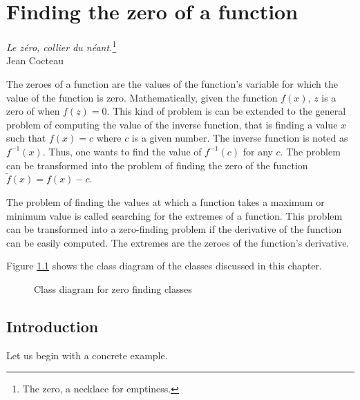 \documentclass[twoside]{book}
\begin{document}
\fi

\chapter{Finding the zero of a function}
\label{ch:zeroes} \vspace{1 ex}
\begin{flushright} {\sl Le z\'ero, collier du n\'eant.}\footnote{The zero, a necklace for emptiness.}\\ Jean Cocteau
\end{flushright}
\vspace{1 ex}
The zeroes of a function are the values of the
function's variable for which the value of the function is zero.
Mathematically, given the function $f\left(x\right)$, $z$ is a
zero of when $f\left(z\right)=0$. This kind of problem is can be
extended to the general problem of computing the value of the
inverse function, that is finding a value $x$ such that
$f\left(x\right)=c$ where $c$ is a given number. The inverse
function is noted as $f^{-1}\left(x\right)$. Thus, one wants to
find the value of $f^{-1}\left(c\right)$ for any $c$. The problem
can be transformed into the problem of finding the zero of the
function $\tilde{f}\left(x\right)=f\left(x\right)-c$.

The problem of finding the values at which a function takes a
maximum or minimum value is called searching for the extremes of a
function. This problem can be transformed into a zero-finding
problem if the derivative of the function can be easily computed.
The extremes are the zeroes of the function's derivative.

\noindent Figure \ref{cl:zeroFinding} shows the class diagram of
the classes discussed in this chapter.
\begin{figure}
\center{}
\caption{Class diagram for zero finding
classes}\label{cl:zeroFinding}
\end{figure}


\section{Introduction}
Let us begin with a concrete example.
\end{document}
